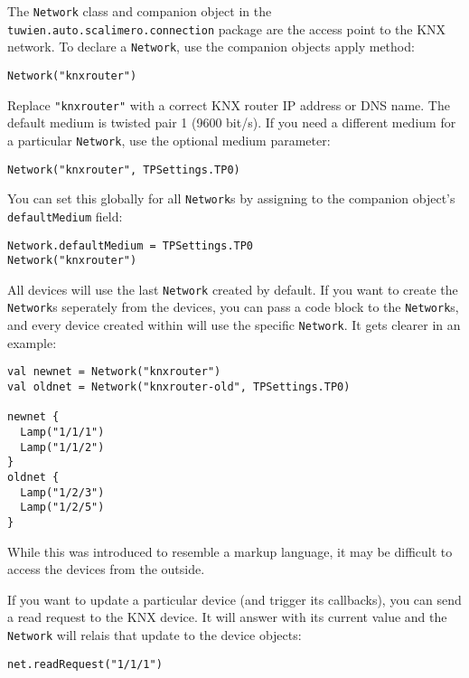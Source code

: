 The \lstinline!Network! class and companion object in the \lstinline!tuwien.auto.scalimero.connection! package are the access point to the KNX network. To declare a \lstinline!Network!, use the companion objects apply method:

\begin{lstlisting}
Network("knxrouter")
\end{lstlisting}

Replace \lstinline!"knxrouter"! with a correct KNX router IP address or DNS name. The default medium is twisted pair 1 (9600 bit/s). If you need a different medium for a particular \lstinline!Network!, use the optional medium parameter:

\begin{lstlisting}
Network("knxrouter", TPSettings.TP0)
\end{lstlisting}

You can set this globally for all \lstinline!Network!s by assigning to the companion object's \lstinline!defaultMedium! field:

\begin{lstlisting}
Network.defaultMedium = TPSettings.TP0
Network("knxrouter")
\end{lstlisting}

All devices will use the last \lstinline!Network! created by default. If you want to create the \lstinline!Network!s seperately from the devices, you can pass a code block to the \lstinline!Network!s, and every device created within will use the specific \lstinline!Network!. It gets clearer in an example:

\begin{lstlisting}
val newnet = Network("knxrouter")
val oldnet = Network("knxrouter-old", TPSettings.TP0)

newnet {
  Lamp("1/1/1")
  Lamp("1/1/2")
}
oldnet {
  Lamp("1/2/3")
  Lamp("1/2/5")
}
\end{lstlisting}

While this was introduced to resemble a markup language, it may be difficult to access the devices from the outside.

If you want to update a particular device (and trigger its callbacks), you can send a read request to the KNX device. It will answer with its current value and the \lstinline!Network! will relais that update to the device objects:

\begin{lstlisting}
net.readRequest("1/1/1")
\end{lstlisting}

